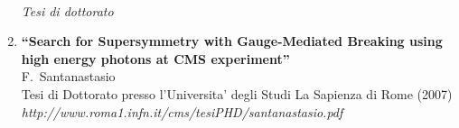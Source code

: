 \documentclass[10pt]{letter}
\begin{document}
\begin{enumerate}
~\\
\begin{center} \textit{Tesi di dottorato} \\  \end{center}

\item%
{\bf ``Search for Supersymmetry with Gauge-Mediated Breaking using high energy photons at CMS experiment''}
  \\{}F.~Santanastasio
  \\{}Tesi di Dottorato presso l'Universita' degli Studi La Sapienza di Rome (2007)
\\{}{\it http://www.roma1.infn.it/cms/tesiPHD/santanastasio.pdf}


\end{enumerate}
\end{document}
